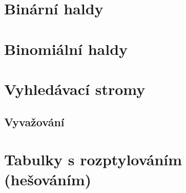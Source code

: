 \section{Binární haldy}
\section{Binomiální haldy}
\section{Vyhledávací stromy}
\subsection{Vyvažování}
\section{Tabulky s rozptylováním (hešováním)}

